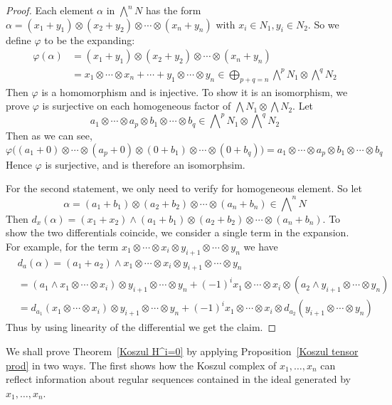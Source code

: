 \begin{proof}
Each element $\alpha$ in $\bigwedge^nN$ has the form $\alpha=(x_1+y_1)\otimes(x_2+y_2)\otimes\cdots\otimes(x_n+y_n)$ with $x_i\in N_1,y_i\in N_2$. So we define $\varphi$ to be the expanding:
\begin{align*}
\varphi(\alpha)&=(x_1+y_1)\otimes(x_2+y_2)\otimes\cdots\otimes(x_n+y_n)\\
&=x_1\otimes\cdots\otimes x_n+\cdots+y_1\otimes\cdots\otimes y_n\in\bigoplus_{p+q=n}\bigwedge\nolimits^pN_1\otimes\bigwedge\nolimits^qN_2
\end{align*}
Then $\varphi$ is a homomorphism and is injective. To show it is an isomorphism, we prove $\varphi$ is surjective on each homogeneous factor of $\bigwedge N_1\otimes\bigwedge N_2$. Let 
\[a_1\otimes\cdots\otimes a_p\otimes b_1\otimes\cdots\otimes b_q\in\bigwedge\nolimits^pN_1\otimes\bigwedge\nolimits^qN_2 \]
Then as we can see,
\[\varphi\big((a_1+0)\otimes\cdots\otimes(a_p+0)\otimes(0+b_1)\otimes\cdots\otimes(0+b_q)\big)=a_1\otimes\cdots\otimes a_p\otimes b_1\otimes\cdots\otimes b_q\]
Hence $\varphi$ is surjective, and is therefore an isomorphsim.\par
For the second statement, we only need to verify for homogeneous element. So let
\[\alpha=(a_1+b_1)\otimes(a_2+b_2)\otimes\cdots\otimes(a_n+b_n)\in\bigwedge\nolimits^nN\]
Then $d_x(\alpha)=(x_1+x_2)\wedge(a_1+b_1)\otimes(a_2+b_2)\otimes\cdots\otimes(a_n+b_n)$. To show the two differentials coincide, we consider a single term in the expansion. For example, for the term $x_1\otimes\cdots\otimes x_i\otimes y_{i+1}\otimes\cdots\otimes y_n$ we have
\begin{align*}
&d_a(\alpha)=(a_1+a_2)\wedge x_1\otimes\cdots\otimes x_i\otimes y_{i+1}\otimes\cdots\otimes y_n\\
&=(a_1\wedge x_1\otimes\cdots\otimes x_i)\otimes y_{i+1}\otimes\cdots\otimes y_n+(-1)^ix_1\otimes\cdots\otimes x_i\otimes(a_2\wedge y_{i+1}\otimes\cdots\otimes y_n)\\
&=d_{a_1}(x_1\otimes\cdots\otimes x_i)\otimes y_{i+1}\otimes\cdots\otimes y_n+(-1)^ix_1\otimes\cdots\otimes x_i\otimes d_{a_2}(y_{i+1}\otimes\cdots\otimes y_n)
\end{align*}
Thus by using linearity of the differential we get the claim.
\end{proof}
We shall prove Theorem~\ref{Koszul H^i=0} by applying Proposition~\ref{Koszul tensor prod} in two ways. The first shows how the Koszul complex of $x_1,\dots,x_n$ can reflect information about regular sequences contained in the ideal generated by $x_1,\dots,x_n$.
